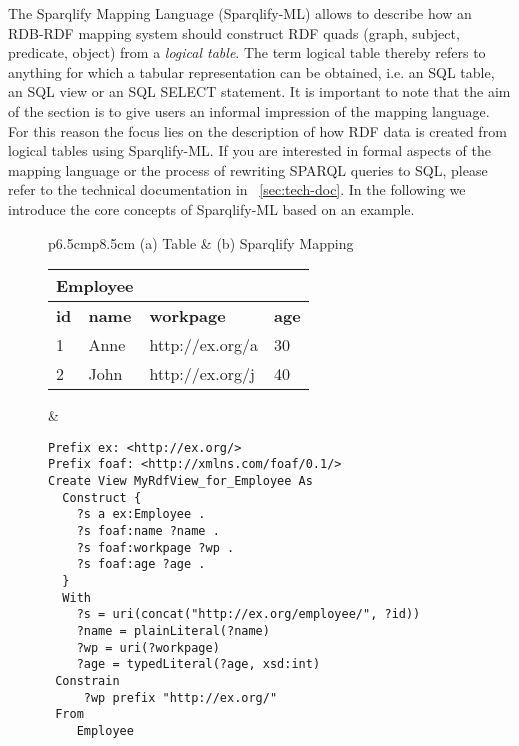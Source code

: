 \documentclass[a4paper,twoside,bibtotoc,abstracton,12pt,BCOR=15mm]{scrreprt}
\begin{document}
The Sparqlify Mapping Language (Sparqlify-ML) allows to describe how an RDB-RDF mapping system should construct RDF
quads (graph, subject, predicate, object) from a \emph{logical table}. 
The term logical table thereby refers to anything for which a tabular representation can be obtained, i.e. an SQL table, an SQL view or an SQL SELECT statement.
It is important to note that the aim of the section is to give users an informal impression of the mapping language.
For this reason the focus lies on the description of how RDF data is created from logical tables using Sparqlify-ML.
If you are interested in formal aspects of the mapping language or the process of rewriting SPARQL queries to SQL, please refer to
the technical documentation in ~\autoref{sec:tech-doc}.
In the following we introduce the core concepts of Sparqlify-ML based on an example.
\begin{figure}[!p] %
\centering
\begin{tabular}{p{6.5cm}p{8.5cm}}
\toprule
(a) Table & (b) Sparqlify Mapping \\ 
\midrule

\begin{tabular}{|l|l|l|l|} \cline{1-2}
\multicolumn{2}{|c|}{Employee} \\ \hline
\textbf{id} & \textbf{name} & \textbf{workpage} & \textbf{age} \\ \hline
1 & Anne & http://ex.org/a  & 30 \\ \hline
2 & John & http://ex.org/j  & 40 \\ \hline
\end{tabular}

&

\begin{minipage}{8.5cm}
\begin{scriptsize}
\begin{verbatim}
Prefix ex: <http://ex.org/>
Prefix foaf: <http://xmlns.com/foaf/0.1/>
Create View MyRdfView_for_Employee As
  Construct {
    ?s a ex:Employee .
    ?s foaf:name ?name .
    ?s foaf:workpage ?wp .
    ?s foaf:age ?age .
  }
  With
    ?s = uri(concat("http://ex.org/employee/", ?id))
    ?name = plainLiteral(?name)
    ?wp = uri(?workpage)
    ?age = typedLiteral(?age, xsd:int)
 Constrain
     ?wp prefix "http://ex.org/"
 From
    Employee
\end{verbatim}
\end{scriptsize}
\end{minipage}



\end{tabular}
\end{figure}
\end{document}
